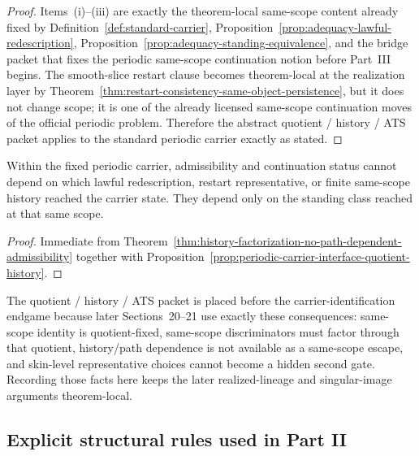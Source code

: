 \begin{proof}
Items~(i)--(iii) are exactly the theorem-local same-scope content already fixed by Definition~\ref{def:standard-carrier}, Proposition~\ref{prop:adequacy-lawful-redescription}, Proposition~\ref{prop:adequacy-standing-equivalence}, and the bridge packet that fixes the periodic same-scope continuation notion before Part~III begins. The smooth-slice restart clause becomes theorem-local at the realization layer by Theorem~\ref{thm:restart-consistency-same-object-persistence}, but it does not change scope; it is one of the already licensed same-scope continuation moves of the official periodic problem. Therefore the abstract quotient / history / ATS packet applies to the standard periodic carrier exactly as stated.
\end{proof}

\begin{corollary}\label{cor:no-path-dependent-periodic-admissibility}
Within the fixed periodic carrier, admissibility and continuation status cannot depend on which lawful redescription, restart representative, or finite same-scope history reached the carrier state. They depend only on the standing class reached at that same scope.
\end{corollary}

\begin{proof}
Immediate from Theorem~\ref{thm:history-factorization-no-path-dependent-admissibility} together with Proposition~\ref{prop:periodic-carrier-interface-quotient-history}.
\end{proof}

\begin{remark}\label{rem:why-quotient-history-packet-here}
The quotient / history / ATS packet is placed before the carrier-identification endgame because later Sections~20--21 use exactly these consequences: same-scope identity is quotient-fixed, same-scope discriminators must factor through that quotient, history/path dependence is not available as a same-scope escape, and skin-level representative choices cannot become a hidden second gate. Recording those facts here keeps the later realized-lineage and singular-image arguments theorem-local.
\end{remark}


\subsection{Explicit structural rules used in Part II}


